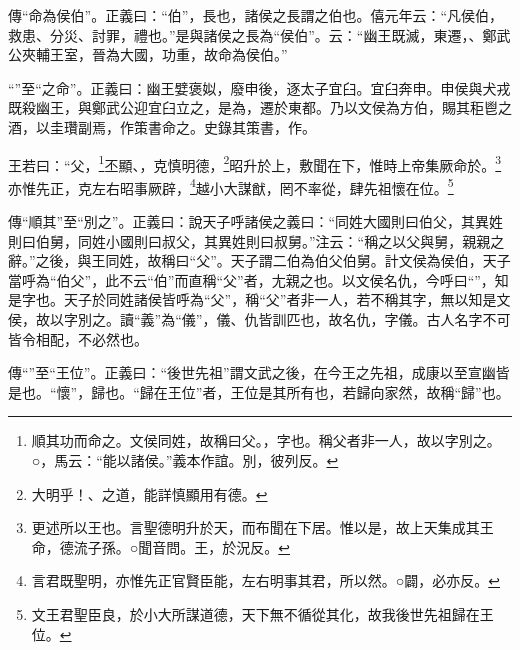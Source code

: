 {\noindent\zhuan{}\fzbyks 傳“命為侯伯”。正義曰：“伯”，長也，諸侯之長謂之伯也。僖元年云：“凡侯伯，救患、分災、討罪，禮也。”是與諸侯之長為“侯伯”。云：“幽王既滅，東遷，、鄭武公夾輔王室，晉為大國，功重，故命為侯伯。” \par}

{\noindent\shu{}\fzkt “”至“之命”。正義曰：幽王嬖褒姒，廢申後，逐太子宜臼。宜臼奔申。申侯與犬戎既殺幽王，與鄭武公迎宜臼立之，是為，遷於東都。乃以文侯為方伯，賜其秬鬯之酒，以圭瓚副焉，作策書命之。史錄其策書，作。 \par}

王若曰：“父，\footnote{順其功而命之。文侯同姓，故稱曰父。，字也。稱父者非一人，故以字別之。○，馬云：“能以諸侯。”義本作誼。別，彼列反。}丕顯、，克慎明德，\footnote{大明乎！、之道，能詳慎顯用有德。}昭升於上，敷聞在下，惟時上帝集厥命於。\footnote{更述所以王也。言聖德明升於天，而布聞在下居。惟以是，故上天集成其王命，德流子孫。○聞音問。王，於況反。}亦惟先正，克左右昭事厥辟，\footnote{言君既聖明，亦惟先正官賢臣能，左右明事其君，所以然。○闢，必亦反。}越小大謀猷，罔不率從，肆先祖懷在位。\footnote{文王君聖臣良，於小大所謀道德，天下無不循從其化，故我後世先祖歸在王位。}


{\noindent\zhuan{}\fzbyks 傳“順其”至“別之”。正義曰：說天子呼諸侯之義曰：“同姓大國則曰伯父，其異姓則曰伯舅，同姓小國則曰叔父，其異姓則曰叔舅。”注云：“稱之以父與舅，親親之辭。”之後，與王同姓，故稱曰“父”。天子謂二伯為伯父伯舅。計文侯為侯伯，天子當呼為“伯父”，此不云“伯”而直稱“父”者，尢親之也。以文侯名仇，今呼曰“”，知是字也。天子於同姓諸侯皆呼為“父”，稱“父”者非一人，若不稱其字，無以知是文侯，故以字別之。讀“義”為“儀”，儀、仇皆訓匹也，故名仇，字儀。古人名字不可皆令相配，不必然也。 \par}

{\noindent\zhuan{}\fzbyks 傳“”至“王位”。正義曰：“後世先祖”謂文武之後，在今王之先祖，成康以至宣幽皆是也。“懷”，歸也。“歸在王位”者，王位是其所有也，若歸向家然，故稱“歸”也。 \par}

